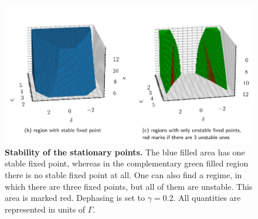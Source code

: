 \begin{figure}[H]
    \hspace*{-1.2cm}
    \includegraphics{pictures/stability_regions_2plots.pdf}
    \caption{\textbf{Stability of the stationary points.} The blue filled area has one stable fixed point, whereas in the complementary green filled region there is no stable fixed point at all. One can also find a regime, in which there are three fixed points, but all of them are unstable. This area is marked red. Dephasing is set to $\gamma=0.2$. All quantities are represented in units of $\Gamma$.}
    \label{fig:stability_of_solutions}
\end{figure}

